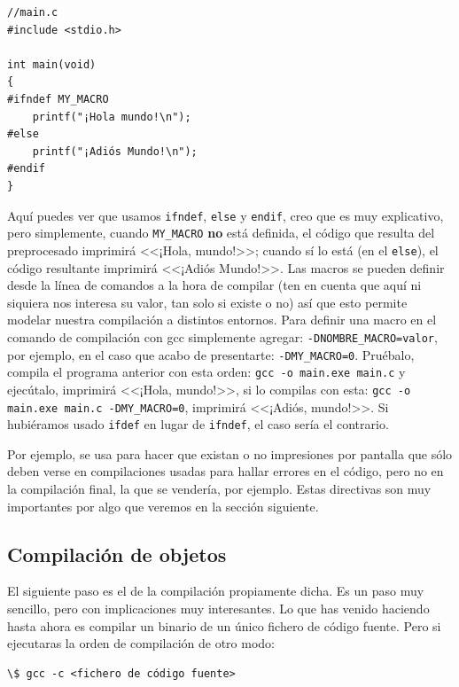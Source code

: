\documentclass[a4paper]{article}
\begin{document}
\noindent
\begin{minipage}[H]{\linewidth}
\mbox{}
\begin{lstlisting}[style=C,
caption={Uso de directivas \texttt{ifdef} e \texttt{ifndef}},
label={lst:ifdefAndIfndef}]
//main.c
#include <stdio.h>

int main(void)
{
#ifndef MY_MACRO
    printf("¡Hola mundo!\n");
#else
    printf("¡Adiós Mundo!\n");
#endif
}
\end{lstlisting}
\end{minipage}

Aquí puedes ver que usamos \verb!ifndef!, \verb!else! y \verb!endif!, creo
que es muy explicativo, pero simplemente, cuando \verb!MY_MACRO! \textbf{no}
está definida, el código que resulta del preprocesado imprimirá
<<¡Hola, mundo!>>; cuando sí lo está (en el \verb!else!), el código resultante
imprimirá <<¡Adiós Mundo!>>. Las macros se pueden definir desde la línea de
comandos a la hora de compilar (ten en cuenta que aquí ni siquiera nos
interesa su valor, tan solo si existe o no) así que esto permite
modelar nuestra compilación a distintos entornos.
Para definir una macro en el comando de compilación con gcc simplemente
agregar: \verb!-DNOMBRE_MACRO=valor!, por ejemplo, en el caso que acabo
de presentarte: \verb!-DMY_MACRO=0!. Pruébalo, compila el programa anterior
con esta orden: \verb!gcc -o main.exe main.c! y ejecútalo, imprimirá <<¡Hola,
mundo!>>, si lo compilas con esta: \verb!gcc -o main.exe main.c -DMY_MACRO=0!,
imprimirá <<¡Adiós, mundo!>>. Si hubiéramos usado \verb!ifdef! en lugar de
\verb!ifndef!, el caso sería el contrario.

Por ejemplo, se usa para
hacer que existan o no impresiones por pantalla que sólo deben verse en
compilaciones usadas para hallar errores en el código, pero no en la compilación
final, la que se vendería, por ejemplo. Estas directivas son muy importantes
por algo que veremos en la sección siguiente.

\subsection{Compilación de objetos}
El siguiente paso es el de la compilación propiamente dicha. Es un paso
muy sencillo, pero con implicaciones muy interesantes. Lo que has venido
haciendo hasta ahora es compilar un binario de un único fichero de código
fuente. Pero si ejecutaras la orden de compilación de otro modo:
\begin{lstlisting}[style=terminalStyle]
    \$ gcc -c <fichero de código fuente>
\end{lstlisting}
\end{document}
